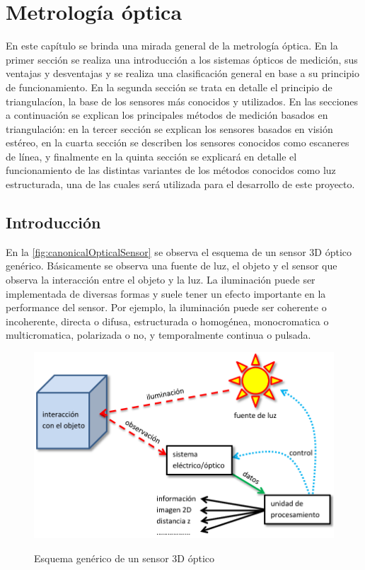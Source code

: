 \chapter{Metrología óptica}\label{ch:metrologiaoptica}

En este capítulo se brinda una mirada general de la metrología óptica.
En la primer sección se realiza una introducción a los sistemas ópticos de medición, sus ventajas y desventajas y se realiza una clasificación general en base a su principio de funcionamiento.
En la segunda sección se trata en detalle el principio de triangulacíon, la base de los sensores más conocidos y utilizados.
En las secciones a continuación se explican los principales métodos de medición basados en triangulación: en la tercer sección se explican los sensores basados en visión estéreo, en la cuarta sección se describen los sensores conocidos como escaneres de línea, y finalmente en la quinta sección se explicará en detalle el funcionamiento de las distintas variantes de los métodos conocidos como luz estructurada, una de las cuales será utilizada para el desarrollo de este proyecto.

\section{Introducción}
En la \autoref{fig:canonicalOpticalSensor} se observa el esquema de un sensor 3D óptico genérico. Básicamente se observa una fuente de luz, el objeto y el sensor que observa la interacción entre el objeto y la luz. La iluminación puede ser implementada de diversas formas y suele tener un efecto importante en la performance del sensor. Por ejemplo, la iluminación puede ser coherente o incoherente, directa o difusa, estructurada o homogénea, monocromatica o multicromatica, polarizada o no, y temporalmente continua o pulsada.

\begin{figure}[bth]
    \myfloatalign
        {\includegraphics[width=0.9\linewidth]{images/genericOptical3DSensor}}
        \caption{Esquema genérico de un sensor 3D óptico}
        \label{fig:canonicalOpticalSensor}
\end{figure}

